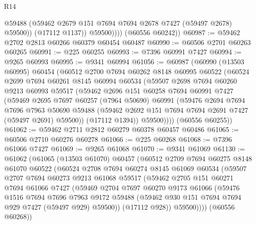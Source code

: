 \begin{lexlean}{R14}
\begin{coremodule}
                  @59488
                  (@59462 @2679 @151 @7694 @7694 @2678 @7427 (@59497 @2678) @59500))
                (@17112 @1137))
              @59500))))
      (@60556 @60242))
@60987 := @59462 @2702 @2813 @60266 @60379 @60454 @60487
@60990 := @60506 @2701 @60263 @60265
@60991 := @225 @60255
@60993 := @7396 @60991 @7427
@60994 := @9265 @60993
@60995 := @9341 @60994
@61056 := @60987
    (@60990
      (@13503 @60995)
      @60454
      (@60512
        @2700
        @7694
        @60262
        @8148
        @60995
        @60522
        (@60524
          @2699
          @7694
          @60261
          @8145
          @60994
          @60534
          (@59507
            @2698
            @7694
            @60260
            @9213
            @60993
            @59517
            (@59462
              @2696
              @151
              @60258
              @7694
              @60991
              @7427
              (@59469
                @2695
                @7697
                @60257
                (@7964 @50690)
                @60991
                (@59476
                  @2694
                  @7694
                  @7696
                  @7963
                  @50690
                  @59488
                  (@59462 @2692 @151 @7694 @7694 @2691 @7427 (@59497 @2691) @59500))
                (@17112 @1394))
              @59500))))
      (@60556 @60255))
@61062 := @59462 @2711 @2812 @60279 @60378 @60457 @60486
@61065 := @60506 @2710 @60276 @60278
@61066 := @225 @60268
@61068 := @7396 @61066 @7427
@61069 := @9265 @61068
@61070 := @9341 @61069
@61130 := @61062
    (@61065
      (@13503 @61070)
      @60457
      (@60512
        @2709
        @7694
        @60275
        @8148
        @61070
        @60522
        (@60524
          @2708
          @7694
          @60274
          @8145
          @61069
          @60534
          (@59507
            @2707
            @7694
            @60273
            @9213
            @61068
            @59517
            (@59462
              @2705
              @151
              @60271
              @7694
              @61066
              @7427
              (@59469
                @2704
                @7697
                @60270
                @9173
                @61066
                (@59476
                  @1516
                  @7694
                  @7696
                  @7963
                  @9172
                  @59488
                  (@59462 @930 @151 @7694 @7694 @929 @7427 (@59497 @929) @59500))
                (@17112 @928))
              @59500))))
      (@60556 @60268))

\end{coremodule}
\end{lexlean}
